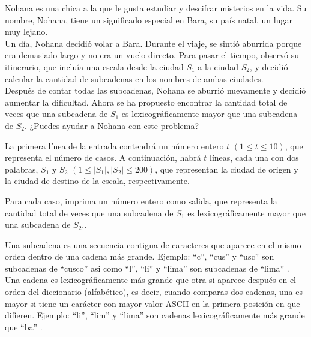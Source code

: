 
Nohana es una chica a la que le gusta estudiar y descifrar misterios en la vida. Su nombre, Nohana, tiene un significado especial en Bara, su país natal, un lugar muy lejano.\\

Un día, Nohana decidió volar a Bara. Durante el viaje, se sintió aburrida porque era demasiado largo y no era un vuelo directo. Para pasar el tiempo, observó su itinerario, que incluía una escala desde la ciudad $S_1$ a la ciudad $S_2$, y decidió calcular la cantidad de subcadenas en los nombres de ambas ciudades.\\

Después de contar todas las subcadenas, Nohana se aburrió nuevamente y decidió aumentar la dificultad. Ahora se ha propuesto encontrar la cantidad total de veces que una subcadena de $S_1$ es lexicográficamente mayor que una subcadena de $S_2$. ¿Puedes ayudar a Nohana con este problema?


La primera línea de la entrada contendrá un número entero $t$ $(1 \le t \le 10)$, que representa el número de casos. A continuación, habrá $t$ líneas, cada una con dos palabras, $S_1$ y $S_2$  $(1 \le |S_1|,|S_2| \le 200)$, que representan la ciudad de origen y la ciudad de destino de la escala, respectivamente.

\outputText

Para cada caso, imprima un número entero como salida, que representa la cantidad total de veces que una subcadena de $S_1$ es lexicográficamente mayor que una subcadena de $S_2$..

\exampleCases

\begin{example}
\end{example}

\explanationText

Una subcadena es una secuencia contigua de caracteres que aparece en el mismo orden dentro de una cadena más grande. Ejemplo: ``c'', ``cus'' y ``usc'' son subcadenas de ``cusco'' asi como ``l'', ``li'' y ``lima''  son subcadenas de ``lima'' .\\

Una cadena es lexicográficamente más grande que otra si aparece después en el orden del diccionario (alfabético), es decir, cuando comparas dos cadenas, una es mayor si tiene un carácter con mayor valor ASCII en la primera posición en que difieren. Ejemplo:  ``li'', ``lim'' y ``lima'' son  cadenas lexicográficamente más grande que  ``ba'' .